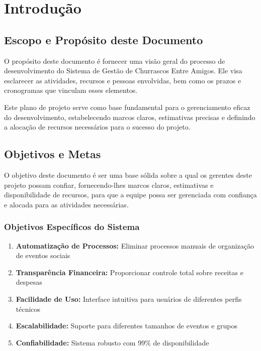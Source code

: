 \section{Introdução}

\subsection{Escopo e Propósito deste Documento}

O propósito deste documento é fornecer uma visão geral do processo de desenvolvimento do Sistema de Gestão de Churrascos Entre Amigos. Ele visa esclarecer as atividades, recursos e pessoas envolvidas, bem como os prazos e cronogramas que vinculam esses elementos.

Este plano de projeto serve como base fundamental para o gerenciamento eficaz do desenvolvimento, estabelecendo marcos claros, estimativas precisas e definindo a alocação de recursos necessários para o sucesso do projeto.

\subsection{Objetivos e Metas}

O objetivo deste documento é ser uma base sólida sobre a qual os gerentes deste projeto possam confiar, fornecendo-lhes marcos claros, estimativas e disponibilidade de recursos, para que a equipe possa ser gerenciada com confiança e alocada para as atividades necessárias.

\subsubsection{Objetivos Específicos do Sistema}

\begin{enumerate}
    \item \textbf{Automatização de Processos:} Eliminar processos manuais de organização de eventos sociais
    \item \textbf{Transparência Financeira:} Proporcionar controle total sobre receitas e despesas
    \item \textbf{Facilidade de Uso:} Interface intuitiva para usuários de diferentes perfis técnicos
    \item \textbf{Escalabilidade:} Suporte para diferentes tamanhos de eventos e grupos
    \item \textbf{Confiabilidade:} Sistema robusto com 99\% de disponibilidade
\end{enumerate}

